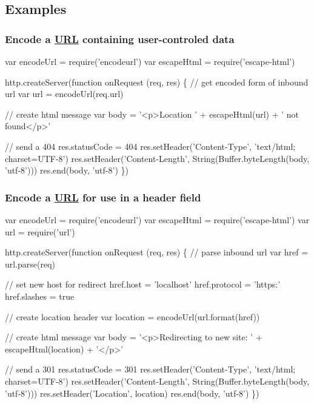 \subsection*{Examples}

\subsubsection*{Encode a \mbox{\hyperlink{namespace_u_r_l}{U\+RL}} containing user-\/controled data}


\begin{DoxyCode}
var encodeUrl = require('encodeurl')
var escapeHtml = require('escape-html')

http.createServer(function onRequest (req, res) \{
  // get encoded form of inbound url
  var url = encodeUrl(req.url)

  // create html message
  var body = '<p>Location ' + escapeHtml(url) + ' not found</p>'

  // send a 404
  res.statusCode = 404
  res.setHeader('Content-Type', 'text/html; charset=UTF-8')
  res.setHeader('Content-Length', String(Buffer.byteLength(body, 'utf-8')))
  res.end(body, 'utf-8')
\})
\end{DoxyCode}


\subsubsection*{Encode a \mbox{\hyperlink{namespace_u_r_l}{U\+RL}} for use in a header field}


\begin{DoxyCode}
var encodeUrl = require('encodeurl')
var escapeHtml = require('escape-html')
var url = require('url')

http.createServer(function onRequest (req, res) \{
  // parse inbound url
  var href = url.parse(req)

  // set new host for redirect
  href.host = 'localhost'
  href.protocol = 'https:'
  href.slashes = true

  // create location header
  var location = encodeUrl(url.format(href))

  // create html message
  var body = '<p>Redirecting to new site: ' + escapeHtml(location) + '</p>'

  // send a 301
  res.statusCode = 301
  res.setHeader('Content-Type', 'text/html; charset=UTF-8')
  res.setHeader('Content-Length', String(Buffer.byteLength(body, 'utf-8')))
  res.setHeader('Location', location)
  res.end(body, 'utf-8')
\})
\end{DoxyCode}


